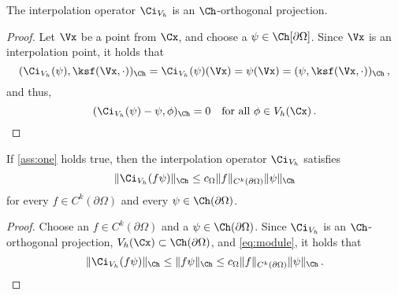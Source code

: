 \documentclass{siamart1116}
\numberwithin{theorem}{section}
\begin{document}
\begin{lemma}
The interpolation operator $\Ci_{V_h}$
is an $\Ch$-orthogonal projection.
\end{lemma}
\begin{proof}
Let $\Vx$ be a point from $\Cx$, and choose a $\psi \in \Ch[\partial\Omega]$.
Since $\Vx$ is an interpolation point, it holds that
\begin{equation}
(\Ci_{V_h}(\psi), \ksf(\Vx, \cdot))_\Ch = \Ci_{V_h}(\psi)(\Vx) = \psi(\Vx) = (\psi, \ksf(\Vx, \cdot))_\Ch\,,
\end{equation}
and thus,
\begin{equation}
(\Ci_{V_h}(\psi) - \psi, \phi)_\Ch = 0 \quad \text{for all } \phi\in V_h(\Cx)\,.
\end{equation}
\end{proof}
\begin{corollary}\label{cor:interpol_operator_continuous1}
If \cref{ass:one} holds true, then
the interpolation operator $\Ci_{V_h}$ satisfies
\begin{equation}\label{eq:estimateInterp}
\Vert \Ci_{V_h}(f\psi) \Vert_\Ch \leq c_\Omega\Vert f \Vert_{C^{k}(\partial\Omega)} \Vert \psi \Vert_\Ch
\end{equation}
for every $f\in C^{k}(\partial\Omega)$ and every $\psi \in \Ch(\partial\Omega)$.
\end{corollary}
\begin{proof}
Choose an $f\in C^{k}(\partial\Omega)$ and a
$\psi \in \Ch(\partial\Omega)$. Since $\Ci_{V_h}$ is an $\Ch$-orthogonal projection, 
$V_h(\Cx)\subset\Ch(\partial\Omega)$, and \cref{eq:module},
it holds that
\begin{equation}
\Vert \Ci_{V_h}(f\psi) \Vert_\Ch \leq\Vert f\psi \Vert_\Ch  \leq c_\Omega\Vert f \Vert_{C^{k}(\partial\Omega)} \Vert \psi \Vert_\Ch\,.
\end{equation}
\end{proof}
\end{document}
